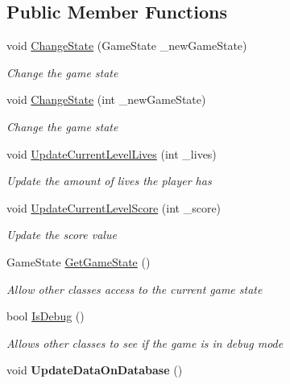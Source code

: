 \subsection*{Public Member Functions}
\begin{DoxyCompactItemize}
\item 
void \mbox{\hyperlink{class_game_manager_a38cc549d56890d3d3097e0a81fd7428f}{Change\+State}} (Game\+State \+\_\+new\+Game\+State)
\begin{DoxyCompactList}\small\item\em Change the game state \end{DoxyCompactList}\item 
void \mbox{\hyperlink{class_game_manager_a1ba9d9459bb03a4046de5fc82734c612}{Change\+State}} (int \+\_\+new\+Game\+State)
\begin{DoxyCompactList}\small\item\em Change the game state \end{DoxyCompactList}\item 
void \mbox{\hyperlink{class_game_manager_a66796650182ecf1f1dc98c8ee889d1a0}{Update\+Current\+Level\+Lives}} (int \+\_\+lives)
\begin{DoxyCompactList}\small\item\em Update the amount of lives the player has \end{DoxyCompactList}\item 
void \mbox{\hyperlink{class_game_manager_ae77f42a6ee1bb7d5192709d24cf6ed34}{Update\+Current\+Level\+Score}} (int \+\_\+score)
\begin{DoxyCompactList}\small\item\em Update the score value \end{DoxyCompactList}\item 
Game\+State \mbox{\hyperlink{class_game_manager_a58134230a7cde001ebf2b25f1dcd6091}{Get\+Game\+State}} ()
\begin{DoxyCompactList}\small\item\em Allow other classes access to the current game state \end{DoxyCompactList}\item 
bool \mbox{\hyperlink{class_game_manager_a35822d3c950f5d43e34c2f020d46c23d}{Is\+Debug}} ()
\begin{DoxyCompactList}\small\item\em Allows other classes to see if the game is in debug mode \end{DoxyCompactList}\item 
\mbox{\label{class_game_manager_a8778b6ae7b19b87aff284883c2bda04a}} 
void {\bfseries Update\+Data\+On\+Database} ()
\end{DoxyCompactItemize}
